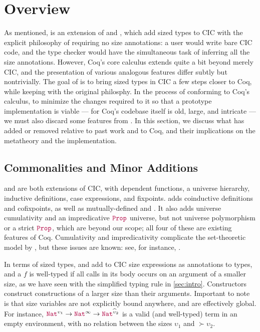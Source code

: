 \section{Overview}\label{sec:overview}

As mentioned, \lang is an extension of \CIChat and \CIChatminus,
which add sized types to CIC with the explicit philosophy of requiring no size annotations:
a user would write bare CIC code, and the type checker would have the simultaneous task of inferring all the size annotations.
However, Coq's core calculus extends quite a bit beyond merely CIC,
and the presentation of various analogous features differ subtly but nontrivially.
The goal of \lang is to bring sized types in CIC a few steps closer to Coq,
while keeping with the original philosphy.
In the process of conforming to Coq's calculus, to minimize the changes required to it so that a prototype implementation is viable
--- for Coq's codebase itself is old, large, and intricate ---
we must also discard some features from \CIChatminus.
In this section, we discuss what \lang has added or removed relative to past work and to Coq,
and their implications on the metatheory and the implementation.

\subsection{Commonalities and Minor Additions}

\lang and \CIChatminus are both extensions of CIC, with dependent functions, a universe hierarchy, inductive definitions, case expressions, and fixpoints.
\lang adds coinductive definitions and cofixpoints, as well as mutually-defined \coinductives and \cofixpoints.
It also adds universe cumulativity and an impredicative $\Prop$ universe,
but not universe polymorphism or a strict $\Prop$,
which are beyond our scope;
all four of these are existing features of Coq.
Cumulativity and impredicativity complicate the set-theoretic model by \citet{cic-hat-minus}, but these issues are known: see, for instance, \citet{not-so-simple-cc}.

In terms of sized types, \lang and \CIChatminus add to CIC size expressions as annotations to \coinductive types,
and a \cofixpoint $f$ is well-typed if all \corecursive calls in its body occurs on an argument of a smaller size,
as we have seen with the simplified typing rule in \autoref{sec:intro}.
Constructors construct constructions of a larger size than their \corecursive arguments.
Important to note is that size variables are not explicitly bound anywhere, and are effectively global.
For instance, $\Nat^{\upsilon_1} \rightarrow \Nat^\infty \rightarrow \Nat^{\succ{\upsilon}_2}$ is a valid (and well-typed) term in an empty environment, with no relation between the sizes $\upsilon_1$ and $\succ{\upsilon}_2$.


